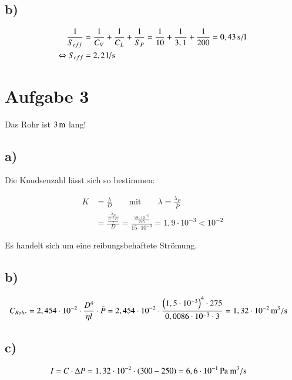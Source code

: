 \subsection*{b)}

\begin{align*}
\frac{1}{S_{eff}} &= \frac{1}{C_V} + \frac{1}{C_L} + \frac{1}{S_P} = \frac{1}{10} + \frac{1}{3,1} + \frac{1}{200} = \unit[0,43]{s/l} \\
\Leftrightarrow S_{eff} &= \unit[2,2]{l/s}
\end{align*}


\section{Aufgabe 3}

Das Rohr ist $\unit[3]{m}$ lang!


\subsection*{a)}

Die Knudsenzahl lässt sich so bestimmen:

\begin{align*}
K &= \frac{\lambda}{D} \qquad \text{mit} \qquad \lambda = \frac{\lambda_P}{\bar{P}} \\
&= \frac{\frac{\lambda_P}{\frac{P_1 + P_2}{2}}}{D} = \frac{\frac{79 \cdot 10^{-6}}{275}}{15 \cdot 10^{-3}} = 1,9 \cdot 10^{-3} < 10^{-2}
\end{align*}

Es handelt sich um eine reibungsbehaftete Strömung.


\subsection*{b)}

\begin{align*}
C_{Rohr} &= 2,454 \cdot 10^{-2} \cdot \frac{D^4}{\eta l} \cdot \bar{P} = 2,454 \cdot 10^{-2} \cdot \frac{\left( 1,5 \cdot 10^{-3} \right)^4 \cdot 275}{0,0086 \cdot 10^{-3} \cdot 3} = \unit[1,32 \cdot 10^{-2}]{m^3/s}
\end{align*}


\subsection*{c)}

\begin{align*}
I &= C \cdot \Delta P = 1,32 \cdot 10^{-2} \cdot \left( 300 - 250 \right) = \unit[6,6 \cdot 10^{-1}]{Pa \ m^3 / s}
\end{align*}



